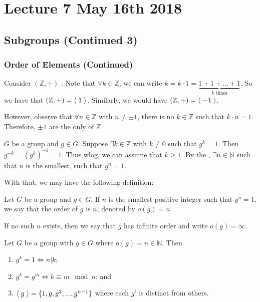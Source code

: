 \chapter{Lecture 7 May 16th 2018}%
\label{chp:lecture_7_may_16th_2018}

\section{Subgroups (Continued 3)}%
\label{sec:subgroups_continued_3}

\subsection{Order of Elements (Continued)}%
\label{sub:order_of_elements_continued}

\begin{eg}
  Consider $(\mathbb{Z}, +)$ . Note that $\forall k \in \mathbb{Z}$, we can write $k = k \cdot 1 = \underbrace{1 + 1 + \hdots + 1}_{k \text{ times}}$. So we have that $(\mathbb{Z} , +) = \langle \; 1 \; \rangle$. Similarly, we would have $(\mathbb{Z} , +) = \langle \; -1 \; \rangle$.

\noindent However, observe that $\forall n \in \mathbb{Z}$ with $n \neq \pm 1$, there is no $k \in \mathbb{Z} $ such that $k \cdot n = 1$. Therefore, $\pm 1$ are the only  of $\mathbb{Z}$.
\end{eg}

 $G$ be a group and $g \in G$. Suppose $\exists k \in \mathbb{Z}$ with $k \neq 0$ such that $g^k = 1$. Then $g^{-k} = ( g^k )^{-1} = 1$. Thus wlog, we can assume that $k \geq 1$. By the , $\exists n \in \mathbb{N}$ such that $n$ is the smallest, such that $g^n = 1$.

With that, we may have the following definition:

\begin{defn}
\label{defn:order_of_an_element}
  Let $G$ be a group and $g \in G$. If $n$ is the smallest positive integer such that $g^n = 1$, we say that the order of $g$ is $n$, denoted by $o(g) = n$.

  \noindent If no such $n$ exists, then we say that $g$ has infinite order and write $o(g) = \infty$.
\end{defn}

\begin{propo}
\label{propo:properties_of_elements_of_finite_order}
  Let $G$ be a group with $g \in G$ where $o(g) = n \in \mathbb{N}$. Then
  \begin{enumerate}
    \item $g^k = 1 \iff n | k$;
    \item $g^k = g^m \iff k \equiv m \mod n$; and
    \item $\langle \; g \; \rangle = \{1, g, g^2, ..., g^{n - 1} \}$ where each $g^i$ is distinct from others.
  \end{enumerate}
\end{propo}

